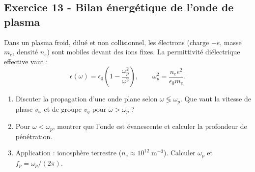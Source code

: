 \documentclass[12pt,a4paper]{article}
\begin{document}
\subsection*{Exercice 13 - Bilan énergétique de l'onde de plasma \niveau{\difficile}}

\begin{boiteexercice}
Dans un plasma froid, dilué et non collisionnel, les électrons (charge $-e$, masse $m_e$, densité $n_e$) sont mobiles devant des ions fixes. La permittivité diélectrique effective vaut :
\[
\epsilon(\omega) = \epsilon_0\!\left(1 - \frac{\omega_p^2}{\omega^2}\right), \qquad \omega_p^2 = \frac{n_e e^2}{\epsilon_0 m_e}.
\]
\begin{enumerate}
  \item Discuter la propagation d'une onde plane selon $\omega \lessgtr \omega_p$. Que vaut la vitesse de phase $v_\varphi$ et de groupe $v_g$ pour $\omega > \omega_p$ ?
  \item Pour $\omega < \omega_p$, montrer que l'onde est évanescente et calculer la profondeur de pénétration.
  \item Application : ionosphère terrestre ($n_e\approx 10^{12}\;\text{m}^{-3}$). Calculer $\omega_p$ et $f_p = \omega_p/(2\pi)$.
\end{enumerate}
\end{boiteexercice}
\end{document}
